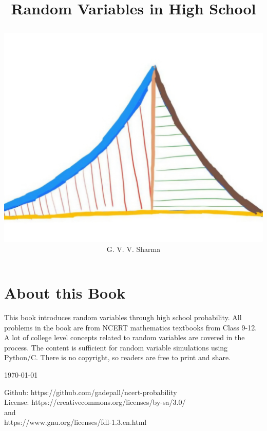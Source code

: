 \documentclass[journal]{IEEEtran}
\begin{document}

\onecolumn


\title{
	\begin{center}
	Random Variables in High School 
\end{center}
}
\author{
\vspace{11cm}
	\begin{center}
\includegraphics[width=0.2\columnwidth]{figs/logo.jpg}
\\
		{	\huge G. V. V. Sharma}
	\end{center}
}
\maketitle
\newpage

\section*{About this Book}

This book introduces random variables through high school probability. All problems in the book are from NCERT mathematics textbooks from Class 9-12.   
  A lot of college level concepts related to random variables are covered in the process.
The content is sufficient for random variable simulations using Python/C.
There is no copyright, so readers are free to print and share.  
\begin{flushright}
\today
\end{flushright}
Github: https://github.com/gadepall/ncert-probability
		\\
License: https://creativecommons.org/licenses/by-sa/3.0/
\\
and
\\
https://www.gnu.org/licenses/fdl-1.3.en.html
\end{document}
